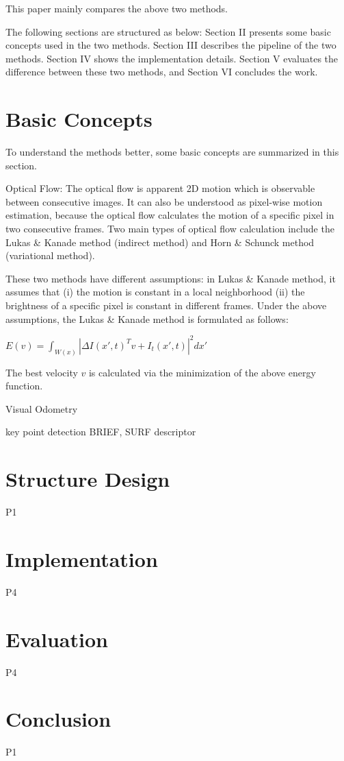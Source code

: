 \documentclass[conference]{IEEEtran}
\begin{document}
This paper mainly compares the above two methods. 

The following sections are structured as below: Section II presents some basic concepts used in the two methods. Section III describes the pipeline of the two methods. Section IV shows the implementation details. Section V evaluates the difference between these two methods, and Section VI concludes the work.


\section{Basic Concepts}
To understand the methods better, some basic concepts are summarized in this section.

\itemize 

\item Optical Flow: 
The optical flow is apparent 2D motion which is observable between consecutive images. It can also be understood as pixel-wise motion estimation, because the optical flow calculates the motion of a specific pixel in two consecutive frames. Two main types of optical flow calculation include the Lukas \& Kanade method (indirect method) and Horn \& Schunck method (variational method). 

These two methods have different assumptions: in Lukas \& Kanade method, it assumes that (i) the motion is constant in a local neighborhood (ii) the brightness of a specific pixel is constant in different frames. Under the above assumptions, the Lukas \& Kanade method is formulated as follows:

$E(v) = \int_{W(x)}^{} |\Delta I(x', t)^Tv + I_t(x',t) |^2dx' $

The best velocity $v$ is calculated via the minimization of the above energy function. 



\item Visual Odometry

\item key point detection BRIEF, SURF descriptor


\section{Structure Design}
P1
\section{Implementation}
P4


\section{Evaluation}
P4

\section{Conclusion}
P1
\end{document}
